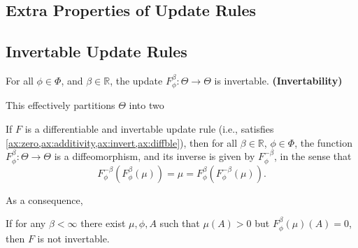 \begin{subappendices}
    \section{Extra Properties of Update Rules}

    \subsection{Invertable Update Rules}

    \begin{LrnAxioms}
    	\item For all $\phi\in\Phi$, and $\beta \in \mathbb R$, the update
    	$F^{\beta}_{\phi}: \Theta \to \Theta$ is invertable.
    	\hfill\textbf{(Invertability)} \label{ax:invert}
    \end{LrnAxioms}


    This effectively partitions $\Theta$ into two


    \begin{prop}
    	If $F$ is a differentiable and invertable update rule (i.e., satisfies \cref{ax:zero,ax:additivity,ax:invert,ax:diffble}), then for all $\beta \in \mathbb R$, $\phi \in \Phi$, the function
    	$F^\beta_\phi : \Theta \to \Theta$
    	is a diffeomorphism, and its inverse is given by $F^{-\beta}_\phi$, in the sense that
    	\[
    		F^{-\beta}_\phi( F^{\beta}_\phi (\mu) ) = \mu = F^{\beta}_\phi( F^{-\beta}_\phi (\mu) ).
    	 \]
    \end{prop}




    As a consequence,
    \begin{coro}
    	If for any $\beta < \infty$ there exist $\mu, \phi, A$ such that
    	$\mu(A) > 0$  but $F^{\beta}_\phi(\mu)(A) = 0$, then $F$ is not invertable.
    \end{coro}



\end{subappendices}
